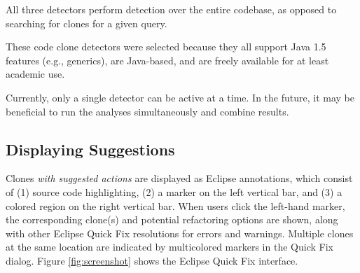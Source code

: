 \documentclass[nocopyrightspace,10pt]{sigplanconf}
\begin{document}
All three detectors perform detection over the entire codebase, as
opposed to searching for clones for a given query. 
 

These code clone detectors were selected because they all support Java
1.5 features (e.g., generics), are Java-based, and are freely
available for at least academic use. 



Currently, only a single detector can be active at a time. In the
future, it may be beneficial to run the analyses simultaneously and
combine results.

\subsection{Displaying Suggestions}
\label{sec:display}
Clones \emph{with suggested actions} are displayed as Eclipse
annotations, which consist of (1) source code highlighting, (2) a
marker on the left vertical bar, and (3) a colored region on the right
vertical bar.
When users click the left-hand marker,
the corresponding clone(s) and potential refactoring options are shown,
along with other Eclipse Quick Fix resolutions for errors and warnings.
Multiple clones at the same location are indicated by multicolored markers
in the Quick Fix dialog.
Figure \ref{fig:screenshot} shows the Eclipse Quick Fix interface.
\end{document}

